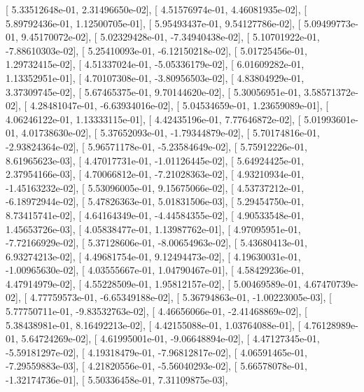 \documentclass{article}
\begin{document}
       [  5.33512648e-01,   2.31496650e-02],
       [  4.51576974e-01,   4.46081935e-02],
       [  5.89792436e-01,   1.12500705e-01],
       [  5.95493437e-01,   9.54127786e-02],
       [  5.09499773e-01,   9.45170072e-02],
       [  5.02329428e-01,  -7.34940438e-02],
       [  5.10701922e-01,  -7.88610303e-02],
       [  5.25410093e-01,  -6.12150218e-02],
       [  5.01725456e-01,   1.29732415e-02],
       [  4.51337024e-01,  -5.05336179e-02],
       [  6.01609282e-01,   1.13352951e-01],
       [  4.70107308e-01,  -3.80956503e-02],
       [  4.83804929e-01,   3.37309745e-02],
       [  5.67465375e-01,   9.70144620e-02],
       [  5.30056951e-01,   3.58571372e-02],
       [  4.28481047e-01,  -6.63934016e-02],
       [  5.04534659e-01,   1.23659089e-01],
       [  4.06246122e-01,   1.13333115e-01],
       [  4.42435196e-01,   7.77646872e-02],
       [  5.01993601e-01,   4.01738630e-02],
       [  5.37652093e-01,  -1.79344879e-02],
       [  5.70174816e-01,  -2.93824364e-02],
       [  5.96571178e-01,  -5.23584649e-02],
       [  5.75912226e-01,   8.61965623e-03],
       [  4.47017731e-01,  -1.01126445e-02],
       [  5.64924425e-01,   2.37954166e-03],
       [  4.70066812e-01,  -7.21028363e-02],
       [  4.93210934e-01,  -1.45163232e-02],
       [  5.53096005e-01,   9.15675066e-02],
       [  4.53737212e-01,  -6.18972944e-02],
       [  5.47826363e-01,   5.01831506e-03],
       [  5.29454750e-01,   8.73415741e-02],
       [  4.64164349e-01,  -4.44584355e-02],
       [  4.90533548e-01,   1.45653726e-03],
       [  4.05838477e-01,   1.13987762e-01],
       [  4.97095951e-01,  -7.72166929e-02],
       [  5.37128606e-01,  -8.00654963e-02],
       [  5.43680413e-01,   6.93274213e-02],
       [  4.49681754e-01,   9.12494473e-02],
       [  4.19630031e-01,  -1.00965630e-02],
       [  4.03555667e-01,   1.04790467e-01],
       [  4.58429236e-01,   4.47914979e-02],
       [  4.55228509e-01,   1.95812157e-02],
       [  5.00469589e-01,   4.67470739e-02],
       [  4.77759573e-01,  -6.65349188e-02],
       [  5.36794863e-01,  -1.00223005e-03],
       [  5.77750711e-01,  -9.83532763e-02],
       [  4.46656066e-01,  -2.41468869e-02],
       [  5.38438981e-01,   8.16492213e-02],
       [  4.42155088e-01,   1.03764088e-01],
       [  4.76128989e-01,   5.64724269e-02],
       [  4.61995001e-01,  -9.06648894e-02],
       [  4.47127345e-01,  -5.59181297e-02],
       [  4.19318479e-01,  -7.96812817e-02],
       [  4.06591465e-01,  -7.29559883e-03],
       [  4.21820556e-01,  -5.56040293e-02],
       [  5.66578078e-01,  -1.32174736e-01],
       [  5.50336458e-01,   7.31109875e-03],
\end{document}
